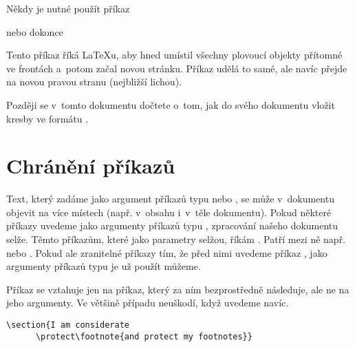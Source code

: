 Někdy je nutné použít příkaz

\begin{lscommand}
 nebo dokonce  
\end{lscommand}

\noindent Tento příkaz říká \LaTeX u, aby hned umístil všechny plovoucí
objekty přítomné ve frontách a~potom začal novou stránku.
Příkaz  udělá to samé, ale navíc přejde na novou pravou stranu (nejbližší lichou).

Později se v~tomto dokumentu dočtete o~tom, jak do svého dokumentu \LaTeXe{}
vložit kresby ve formátu \PSi{}.

\section{Chránění  příkazů}

Text, který zadáme jako argument příkazů typu  nebo ,
se může v~dokumentu objevit na více místech (např. v~obsahu i~v~těle
dokumentu). Pokud některé příkazy uvedeme jako argumenty příkazů
typu , zpracování našeho dokumentu selže. Těmto příkazům,
které jako parametry selžou, říkám . Patří
mezi ně např.  nebo . Pokud ale zranitelné příkazy
 tím, že před nimi uvedeme příkaz ,
jako argumenty příkazů typu  je už použít můžeme.

Příkaz  se vztahuje jen na příkaz, který za ním bezprostředně následuje,
ale ne na jeho argumenty. Ve většině případu neuškodí, když 
uvedeme navíc.

\begin{code}
\verb|\section{I am considerate|\\
\verb|      \protect\footnote{and protect my footnotes}}|
\end{code}

